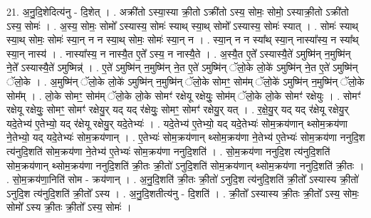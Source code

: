 \documentclass[17pt]{extarticle}
\begin{document}
21. अ॒नु॒दि॒शेदित्य॑नु - दि॒शेत् । . अक्री॑तो ऽस्या॒स्या क्री॒तो ऽक्री॑तो ऽस्य॒ सोमः॒ सोमो॒ ऽस्याक्री॒तो ऽक्री॑तो ऽस्य॒ सोमः॑ । . अ॒स्य॒ सोमः॒ सोमो᳚ ऽस्यास्य॒ सोमः॑ स्याथ् स्या॒थ् सोमो᳚ ऽस्यास्य॒ सोमः॑ स्यात् । . सोमः॑ स्याथ् स्या॒थ् सोमः॒ सोमः॑ स्या॒न् न न स्या॒थ् सोमः॒ सोमः॑ स्या॒न् न । . स्या॒न् न न स्या᳚थ् स्या॒न् नास्या᳚स्य॒ न स्या᳚थ् स्या॒न् नास्य॑ । . नास्या᳚स्य॒ न नास्यै॒त ए॒ते᳚ ऽस्य॒ न नास्यै॒ते । . अ॒स्यै॒त ए॒ते᳚ ऽस्यास्यै॒ते॑ ऽमुष्मि॑न् न॒मुष्मि॑न् ने॒ते᳚ ऽस्यास्यै॒ते॑ ऽमुष्मिन्न्॑ । . ए॒ते॑ ऽमुष्मि॑न् न॒मुष्मि॑न् ने॒त ए॒ते॑ ऽमुष्मि॑न् ॅलो॒के लो॒के॑ ऽमुष्मि॑न् ने॒त ए॒ते॑ ऽमुष्मि॑न् ॅलो॒के । . अ॒मुष्मि॑न् ॅलो॒के लो॒के॑ ऽमुष्मि॑न् न॒मुष्मि॑न् ॅलो॒के सोमꣳ॒॒ सोम॑म् ॅलो॒के॑ ऽमुष्मि॑न् न॒मुष्मि॑न् ॅलो॒के सोम᳚म् । . लो॒के सोमꣳ॒॒ सोम॑म् ॅलो॒के लो॒के सोमꣳ॑ रक्षेयू रक्षेयुः॒ सोम॑म् ॅलो॒के लो॒के सोमꣳ॑ रक्षेयुः । . सोमꣳ॑ रक्षेयू रक्षेयुः॒ सोमꣳ॒॒ सोमꣳ॑ रक्षेयु॒र् यद् यद् र॑क्षेयुः॒ सोमꣳ॒॒ सोमꣳ॑ रक्षेयु॒र् यत् । . र॒क्षे॒यु॒र् यद् यद् र॑क्षेयू रक्षेयु॒र् यदे॒तेभ्य॑ ए॒तेभ्यो॒ यद् र॑क्षेयू रक्षेयु॒र् यदे॒तेभ्यः॑ । . यदे॒तेभ्य॑ ए॒तेभ्यो॒ यद् यदे॒तेभ्यः॑ सोम॒क्रय॑णान् थ्सोम॒क्रय॑णा ने॒तेभ्यो॒ यद् यदे॒तेभ्यः॑ सोम॒क्रय॑णान् । . ए॒तेभ्यः॑ सोम॒क्रय॑णान् थ्सोम॒क्रय॑णा ने॒तेभ्य॑ ए॒तेभ्यः॑ सोम॒क्रय॑णा ननुदि॒श त्य॑नुदि॒शति॑ सोम॒क्रय॑णा ने॒तेभ्य॑ ए॒तेभ्यः॑ सोम॒क्रय॑णा ननुदि॒शति॑ । . सो॒म॒क्रय॑णा ननुदि॒श त्य॑नुदि॒शति॑ सोम॒क्रय॑णान् थ्सोम॒क्रय॑णा ननुदि॒शति॑ क्री॒तः क्री॒तो॑ ऽनुदि॒शति॑ सोम॒क्रय॑णान् थ्सोम॒क्रय॑णा ननुदि॒शति॑ क्री॒तः । . सो॒म॒क्रय॑णा॒निति॑ सोम - क्रय॑णान् । . अ॒नु॒दि॒शति॑ क्री॒तः क्री॒तो॑ ऽनुदि॒श त्य॑नुदि॒शति॑ क्री॒तो᳚ ऽस्यास्य क्री॒तो॑ ऽनुदि॒श त्य॑नुदि॒शति॑ क्री॒तो᳚ ऽस्य । . अ॒नु॒दि॒शतीत्य॑नु - दि॒शति॑ । . क्री॒तो᳚ ऽस्यास्य क्री॒तः क्री॒तो᳚ ऽस्य॒ सोमः॒ सोमो᳚ ऽस्य क्री॒तः क्री॒तो᳚ ऽस्य॒ सोमः॑ । \newline
\end{document}
